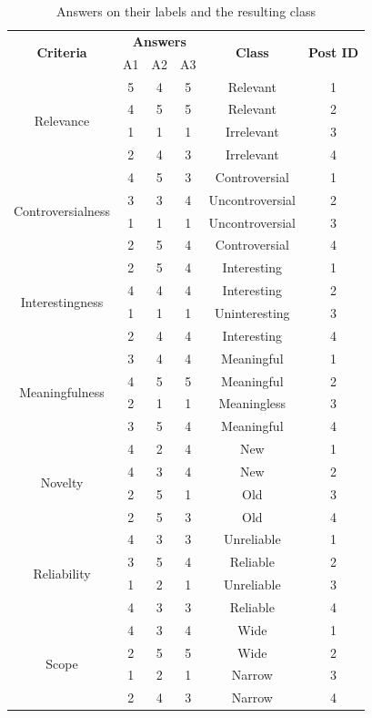 \begin{table}[H]
\small
\centering
\begin{tabular}{|c|c|c|c|c|c|}
\hline
\multirow{2}{*}{\textbf{Criteria}} & \multicolumn{3}{c|}{\textbf{Answers}} & \multirow{2}{*}{\textbf{Class}} &  \multirow{2}{*}{\textbf{Post ID}} \\ \cline{2-4}
 & A1 & A2 & A3 & & \\ \hline
\multirow{4}{*}{Relevance} & 5 & 4 & 5 & Relevant & 1\\ \cline{2-6} 
 & 4 & 5 & 5 & Relevant & 2\\ \cline{2-6} 
 & 1 & 1 & 1 & Irrelevant & 3\\ \cline{2-6} 
 & 2 & 4 & 3 & Irrelevant & 4\\ \hline
 \multirow{4}{*}{Controversialness}  & 4 & 5 & 3 & Controversial & 1\\ \cline{2-6}  
 & 3 & 3 & 4 & Uncontroversial & 2 \\ \cline{2-6} 
 & 1 & 1 & 1 & Uncontroversial & 3\\ \cline{2-6}
 & 2 & 5 & 4 & Controversial & 4\\ \hline
  \multirow{4}{*}{Interestingness}  & 2 & 5 & 4 & Interesting & 1 \\ \cline{2-6} 
 & 4 & 4 & 4 & Interesting & 2\\ \cline{2-6} 
 & 1 & 1 & 1 & Uninteresting & 3\\ \cline{2-6}
 & 2 & 4 & 4 & Interesting & 4\\ \hline
  \multirow{4}{*}{Meaningfulness}  & 3 & 4 & 4 & Meaningful & 1 \\ \cline{2-6} 
 & 4 & 5 & 5 & Meaningful & 2 \\ \cline{2-6} 
 & 2 & 1 & 1 & Meaningless & 3\\ \cline{2-6}
 & 3 & 5 & 4 & Meaningful & 4\\ \hline
  \multirow{4}{*}{Novelty}  & 4 & 2 & 4 & New  & 1\\ \cline{2-6} 
 & 4 & 3 & 4 & New & 2 \\ \cline{2-6} 
 & 2 & 5 & 1 & Old & 3\\ \cline{2-6}
 & 2 & 5 & 3 & Old & 4\\ \hline
  \multirow{4}{*}{Reliability}  & 4 & 3 & 3 & Unreliable & 1 \\ \cline{2-6} 
 & 3 & 5 & 4 & Reliable & 2\\ \cline{2-6} 
 & 1 & 2 & 1 & Unreliable & 3\\ \cline{2-6}
 & 4 & 3 & 3 & Reliable & 4\\ \hline
  \multirow{4}{*}{Scope}  & 4 & 3 & 4 & Wide & 1\\ \cline{2-6} 
 & 2 & 5 & 5 & Wide & 2\\ \cline{2-6} 
 & 1 & 2 & 1 & Narrow & 3 \\ \cline{2-6}
 & 2 & 4 & 3 & Narrow & 4\\ \hline
\end{tabular}	
\caption[Answers on their labels and the resulting class]{Answers on their labels and the resulting class}
\label{tab:label-answers}
\end{table}


